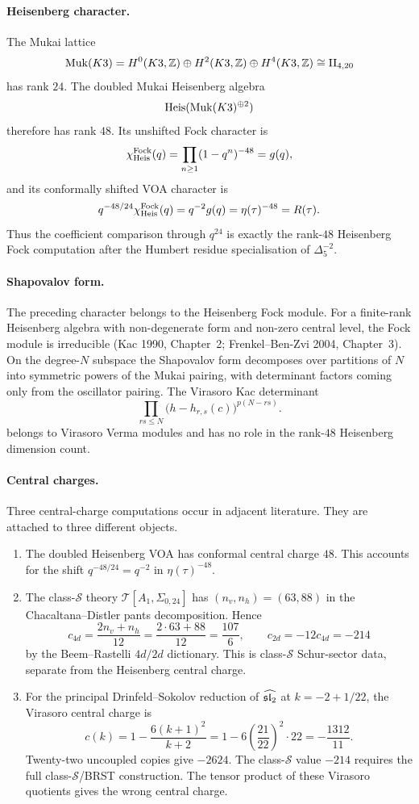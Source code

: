 \paragraph{Heisenberg character.}
The Mukai lattice
\[
  \mathrm{Muk}(K3)=H^0(K3,\mathbb Z)\oplus H^2(K3,\mathbb Z)\oplus H^4(K3,\mathbb Z)
  \cong \mathrm{II}_{4,20}
\]
has rank $24$. The doubled Mukai Heisenberg algebra
\[
  \mathrm{Heis}(\mathrm{Muk}(K3)^{\oplus2})
\]
therefore has rank $48$. Its unshifted Fock character is
\[
  \chi_{\mathrm{Heis}}^{\mathrm{Fock}}(q)
  =
  \prod_{n\geq1}(1-q^n)^{-48}=g(q),
\]
and its conformally shifted VOA character is
\[
  q^{-48/24}\chi_{\mathrm{Heis}}^{\mathrm{Fock}}(q)
  =
  q^{-2}g(q)=\eta(\tau)^{-48}=R(\tau).
\]
Thus the coefficient comparison through $q^{24}$ is exactly the
rank-$48$ Heisenberg Fock computation after the Humbert residue
specialisation of $\Delta_5^{-2}$.

\paragraph{Shapovalov form.}
The preceding character belongs to the Heisenberg Fock module. For a
finite-rank Heisenberg algebra with non-degenerate form and non-zero
central level, the Fock module is
irreducible (Kac 1990, Chapter~2; Frenkel--Ben-Zvi 2004,
Chapter~3). On the degree-$N$ subspace the Shapovalov form decomposes
over partitions of $N$ into symmetric powers of the Mukai pairing,
with determinant factors coming only from the oscillator pairing. The
Virasoro Kac determinant
\[
  \prod_{rs\leq N}\bigl(h-h_{r,s}(c)\bigr)^{p(N-rs)}.
\]
belongs to Virasoro Verma modules and has no role in the rank-$48$
Heisenberg dimension count.

\paragraph{Central charges.}
Three central-charge computations occur in adjacent literature. They are
attached to three different objects.

\begin{enumerate}[leftmargin=1.5em]
\item The doubled Heisenberg VOA has conformal central charge $48$.
This accounts for the shift $q^{-48/24}=q^{-2}$ in
$\eta(\tau)^{-48}$.
\item The class-$\mathcal S$ theory
$\mathcal T[A_1,\Sigma_{0,24}]$ has
$(n_v,n_h)=(63,88)$ in the Chacaltana--Distler pants decomposition.
Hence
\[
  c_{4d}=\frac{2n_v+n_h}{12}=\frac{2\cdot63+88}{12}
        =\frac{107}{6},
  \qquad
  c_{2d}=-12c_{4d}=-214
\]
by the Beem--Rastelli $4d/2d$ dictionary. This is class-$\mathcal S$
Schur-sector data, separate from the Heisenberg central charge.
\item For the principal Drinfeld--Sokolov reduction of
$\widehat{\mathfrak{sl}_2}$ at $k=-2+1/22$, the Virasoro central charge is
\[
  c(k)=1-\frac{6(k+1)^2}{k+2}
      =1-6\left(\frac{21}{22}\right)^2\cdot22
      =-\frac{1312}{11}.
\]
Twenty-two uncoupled copies give $-2624$. The class-$\mathcal S$ value
\(-214\) requires the full class-$\mathcal S$/BRST construction. The
tensor product of these Virasoro quotients gives the wrong central
charge.
\end{enumerate}

